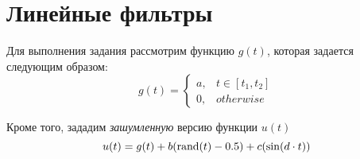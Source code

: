 \section{Линейные фильтры}

Для выполнения задания рассмотрим функцию $g(t)$, которая задается следующим образом: 
\begin{equation}
    g(t) = \begin{cases}
        a, & t \in [t_1, t_2]\\
        0, & otherwise
    \end{cases}
\end{equation}

Кроме того, зададим \textit{зашумленную} версию функции $u(t)$ 
\begin{equation}
    u(t) = g(t) + b(\operatorname{\text{rand}}(t) - 0.5) + c(\sin(d \cdot t))  
    \label{eq:noise}
\end{equation}




\FloatBarrier


